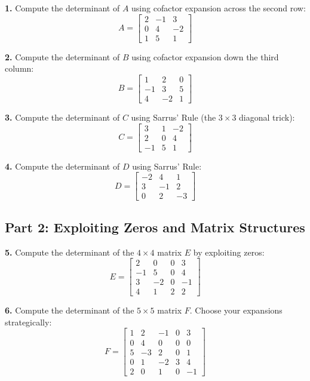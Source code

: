 \documentclass[11pt]{article}
\begin{document}
\textbf{1.} Compute the determinant of $A$ using cofactor expansion across the second row:
$$A = \begin{bmatrix} 2 & -1 & 3 \\ 0 & 4 & -2 \\ 1 & 5 & 1 \end{bmatrix}$$

\textbf{2.} Compute the determinant of $B$ using cofactor expansion down the third column:
$$B = \begin{bmatrix} 1 & 2 & 0 \\ -1 & 3 & 5 \\ 4 & -2 & 1 \end{bmatrix}$$

\textbf{3.} Compute the determinant of $C$ using Sarrus' Rule (the $3 \times 3$ diagonal trick):
$$C = \begin{bmatrix} 3 & 1 & -2 \\ 2 & 0 & 4 \\ -1 & 5 & 1 \end{bmatrix}$$

\textbf{4.} Compute the determinant of $D$ using Sarrus' Rule:
$$D = \begin{bmatrix} -2 & 4 & 1 \\ 3 & -1 & 2 \\ 0 & 2 & -3 \end{bmatrix}$$

\subsection*{Part 2: Exploiting Zeros and Matrix Structures}

\textbf{5.} Compute the determinant of the $4 \times 4$ matrix $E$ by exploiting zeros:
$$E = \begin{bmatrix} 2 & 0 & 0 & 3 \\ -1 & 5 & 0 & 4 \\ 3 & -2 & 0 & -1 \\ 4 & 1 & 2 & 2 \end{bmatrix}$$

\textbf{6.} Compute the determinant of the $5 \times 5$ matrix $F$. Choose your expansions strategically:
$$F = \begin{bmatrix} 1 & 2 & -1 & 0 & 3 \\ 0 & 4 & 0 & 0 & 0 \\ 5 & -3 & 2 & 0 & 1 \\ 0 & 1 & -2 & 3 & 4 \\ 2 & 0 & 1 & 0 & -1 \end{bmatrix}$$
\end{document}
